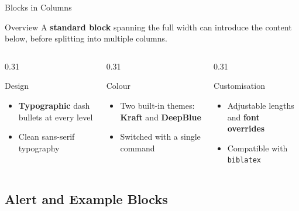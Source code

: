 \documentclass[aspectratio=169]{beamer}
\begin{document}
\begin{frame}{Blocks in Columns}
  \begin{block}{Overview}
    {\small A \textbf{standard block} spanning the full width can introduce
    the content below, before splitting into multiple columns.}
  \end{block}
  \begin{columns}[T]
    \begin{column}{0.31\textwidth}
      \begin{block}{Design}
        {\small
          \begin{itemize}
            \item \textbf{Typographic} dash bullets at every level
            \item Clean sans-serif typography
          \end{itemize}
        }
      \end{block}
    \end{column}
    \begin{column}{0.31\textwidth}
      \begin{block}{Colour}
        {\small
          \begin{itemize}
            \item Two built-in themes: \textbf{Kraft} and \textbf{DeepBlue}
            \item Switched with a single command
          \end{itemize}
        }
      \end{block}
    \end{column}
    \begin{column}{0.31\textwidth}
      \begin{block}{Customisation}
        {\small
          \begin{itemize}
            \item Adjustable lengths and \textbf{font overrides}
            \item Compatible with \texttt{biblatex}
          \end{itemize}
        }
      \end{block}
    \end{column}
  \end{columns}
\end{frame}


\subsection{Alert and Example Blocks}
\end{document}
